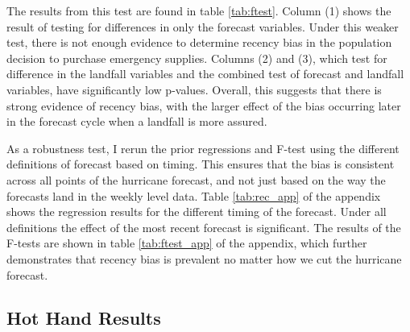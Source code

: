 \documentclass{article}
\begin{document}
The results from this test are found in table \ref{tab:ftest}. Column (1) shows the result of testing for differences in only the forecast variables. Under this weaker test, there is not enough evidence to determine recency bias in the population decision to purchase emergency supplies. Columns (2) and (3), which test for difference in the landfall variables and the combined test of forecast and landfall variables, have significantly low p-values. Overall, this suggests that there is strong evidence of recency bias, with the larger effect of the bias occurring later in the forecast cycle when a landfall is more assured. 

As a robustness test, I rerun the prior regressions and F-test using the different definitions of forecast based on timing. This ensures that the bias is consistent across all points of the hurricane forecast, and not just based on the way the forecasts land in the weekly level data. Table \ref{tab:rec_app} of the appendix shows the regression results for the different timing of the forecast. Under all definitions the effect of the most recent forecast is significant. The results of the F-tests are shown in table \ref{tab:ftest_app} of the appendix, which further demonstrates that recency bias is prevalent no matter how we cut the hurricane forecast. 

\subsection{Hot Hand Results}
\end{document}
